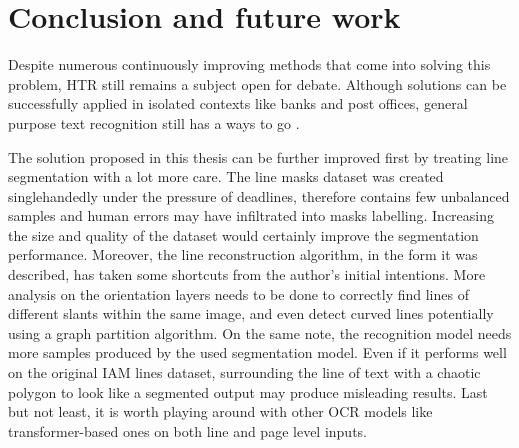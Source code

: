 \chapter{Conclusion and future work}
\label{chap:ch7}

Despite numerous continuously improving methods that come into solving this problem, HTR still remains a subject open for debate. Although solutions can be successfully applied in isolated contexts like banks and post offices, general purpose text recognition still has a ways to go \cite{ocr_review}.

The solution proposed in this thesis can be further improved first by treating line segmentation with a lot more care. The line masks dataset was created singlehandedly under the pressure of deadlines, therefore contains few unbalanced samples and human errors may have infiltrated into masks labelling. Increasing the size and quality of the dataset would certainly improve the segmentation performance. Moreover, the line reconstruction algorithm, in the form it was described, has taken some shortcuts from the author's initial intentions. More analysis on the orientation layers needs to be done to correctly find lines of different slants within the same image, and even detect curved lines potentially using a graph partition algorithm. On the same note, the recognition model needs more samples produced by the used segmentation model. Even if it performs well on the original IAM lines dataset, surrounding the line of text with a chaotic polygon to look like a segmented output may produce misleading results.
Last but not least, it is worth playing around with other OCR models like transformer-based ones on both line and page level inputs.